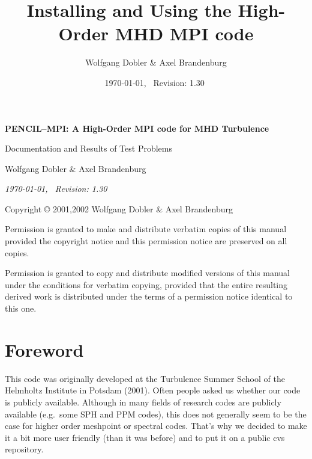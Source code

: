 \documentclass[12pt,twoside,notitlepage,a4paper]{article}
\title{{\sffamily\bfseries Installing and Using the High-Order MHD MPI code}}
\author{Wolfgang Dobler \& Axel Brandenburg}
\date{\today,~ $ $Revision: 1.30 $ $}
\begin{document}
\pagestyle{empty}


\begin{titlepage}
  \begin{center}

  \large

  \vspace*{3cm}

  {\Large\sffamily\bfseries PENCIL--MPI: A High-Order MPI code for MHD Turbulence}

  \vspace{0.5cm}

  {\sffamily Documentation and Results of Test Problems}

  \vspace{1.5cm}

  {Wolfgang Dobler \& Axel Brandenburg}


  \vspace{2cm}

  \emph{\today,~ $ $Revision: 1.30 $ $}


\end{center}

\end{titlepage}


\newpage
\mbox{}
\vfill

Copyright \copyright{} 2001,2002 Wolfgang Dobler \& Axel Brandenburg
\bigskip

Permission is granted to make and distribute verbatim copies of
this manual provided the copyright notice and this permission notice
are preserved on all copies.

Permission is granted to copy and distribute modified versions
of this manual under the conditions for verbatim copying,
provided that the entire resulting derived work is distributed under the
terms of a permission notice identical to this one.


\clearpage
\pagestyle{plain}

\section*{Foreword}

This code was originally developed at the Turbulence Summer School of the
Helmholtz Institute in Potsdam (2001).
Often people asked us whether our code is publicly available.
Although in many fields of research codes are publicly available
(e.g.\ some SPH and PPM codes), this does not generally seem to be
the case for higher order meshpoint or spectral codes.
That's why we decided to make it a bit more user friendly (than it was before)
and to put it on a public cvs repository.
\end{document}
